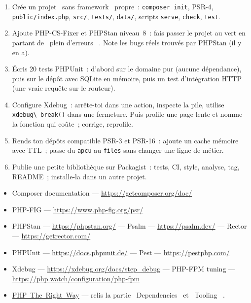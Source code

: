 \documentclass[12pt,a4paper,twoside,openright]{book}
\newcommand{\link}[2]{\href{#2}{#1}}
\begin{document}
\begin{exercice}
\begin{enumerate}
  \item Cr\'ee un projet \og ~sans framework~ \fg{} propre~: \verb|composer init|, PSR-4, \verb|public/index.php|,
        \verb|src/|, \verb|tests/|, \verb|data/|, scripts \verb|serve|, \verb|check|, \verb|test|.
  \item Ajoute PHP-CS-Fixer et PHPStan niveau~8~: fais passer le projet au vert en partant de
        \og ~plein d'erreurs~ \fg{}. Note les bugs r\'eels trouv\'es par PHPStan (il y en a).
  \item \'Ecris 20 tests PHPUnit~: d'abord sur le domaine pur (aucune d\'ependance), puis sur le d\'ep\^ot
        avec SQLite en m\'emoire, puis un test d'int\'egration HTTP (une vraie requ\^ete sur le routeur).
  \item Configure Xdebug~: arr\^ete-toi dans une action, inspecte la pile, utilise
        \verb|xdebug\_break()| dans une fermeture. Puis profile une page lente et nomme la fonction
        qui co\^ute~; corrige, reprofile.
  \item Rends ton d\'ep\^ots compatible PSR-3 et PSR-16~: ajoute un cache m\'emoire avec TTL~; passe
        du \verb|apcu| au \verb|files| sans changer une ligne de m\'etier.
  \item Publie une petite biblioth\`eque sur Packagist~: tests, CI, style, analyse, tag, README~;
        installe-la dans un autre projet.
\end{enumerate}
\end{exercice}

\begin{ressources}
\begin{itemize}
  \item Composer documentation --- \url{https://getcomposer.org/doc/}
  \item PHP-FIG --- \url{https://www.php-fig.org/psr/}
  \item PHPStan --- \url{https://phpstan.org/} --- Psalm --- \url{https://psalm.dev/} --- Rector --- \url{https://getrector.com/}
  \item PHPUnit --- \url{https://docs.phpunit.de/} --- Pest --- \url{https://pestphp.com/}
  \item Xdebug --- \url{https://xdebug.org/docs/step_debug} --- PHP-FPM tuning --- \url{https://php.watch/configuration/php-fpm}
  \item \link{PHP~The~Right~Way}{https://phptherightway.com/} --- relis la partie \og ~Dependencies~ \fg{} et \og ~Tooling~ \fg{}.
\end{itemize}
\end{ressources}
\end{document}
